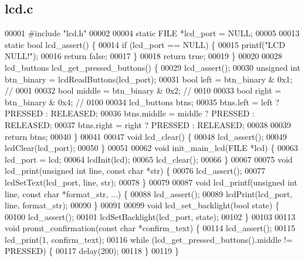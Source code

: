 \subsection{lcd.\+c}
\label{a00104_source}

\begin{DoxyCode}
00001 \textcolor{preprocessor}{#include "lcd.h"}
00002 
00004 \textcolor{keyword}{static} FILE *lcd_port = NULL;
00005 
00013 \textcolor{keyword}{static} \textcolor{keywordtype}{bool} lcd_assert() \{
00014   \textcolor{keywordflow}{if} (lcd_port == NULL) \{
00015     printf(\textcolor{stringliteral}{"LCD NULL!"});
00016     \textcolor{keywordflow}{return} \textcolor{keyword}{false};
00017   \}
00018   \textcolor{keywordflow}{return} \textcolor{keyword}{true};
00019 \}
00020 
00028 lcd_buttons lcd_get_pressed_buttons() \{
00029   lcd_assert();
00030   \textcolor{keywordtype}{unsigned} \textcolor{keywordtype}{int} btn\_binary = lcdReadButtons(lcd_port);
00031   \textcolor{keywordtype}{bool} left = btn\_binary & 0x1;   \textcolor{comment}{// 0001}
00032   \textcolor{keywordtype}{bool} middle = btn\_binary & 0x2; \textcolor{comment}{// 0010}
00033   \textcolor{keywordtype}{bool} right = btn\_binary & 0x4;  \textcolor{comment}{// 0100}
00034   lcd_buttons btns;
00035   btns.left = left ? PRESSED : RELEASED;
00036   btns.middle = middle ? PRESSED : RELEASED;
00037   btns.right = right ? PRESSED : RELEASED;
00038 
00039   \textcolor{keywordflow}{return} btns;
00040 \}
00041 
00047 \textcolor{keywordtype}{void} lcd_clear() \{
00048   lcd_assert();
00049   lcdClear(lcd_port);
00050 \}
00051 
00062 \textcolor{keywordtype}{void} init_main_lcd(FILE *lcd) \{
00063   lcd_port = lcd;
00064   lcdInit(lcd);
00065   lcd_clear();
00066 \}
00067 
00075 \textcolor{keywordtype}{void} lcd_print(\textcolor{keywordtype}{unsigned} \textcolor{keywordtype}{int} line, \textcolor{keyword}{const} \textcolor{keywordtype}{char} *str) \{
00076   lcd_assert();
00077   lcdSetText(lcd_port, line, str);
00078 \}
00079 
00087 \textcolor{keywordtype}{void} lcd_printf(\textcolor{keywordtype}{unsigned} \textcolor{keywordtype}{int} line, \textcolor{keyword}{const} \textcolor{keywordtype}{char} *format\_str, ...) \{
00088   lcd_assert();
00089   lcdPrint(lcd_port, line, format\_str);
00090 \}
00091 
00099 \textcolor{keywordtype}{void} lcd_set_backlight(\textcolor{keywordtype}{bool} state) \{
00100   lcd_assert();
00101   lcdSetBacklight(lcd_port, state);
00102 \}
00103 
00113 \textcolor{keywordtype}{void} promt_confirmation(\textcolor{keyword}{const} \textcolor{keywordtype}{char} *confirm\_text) \{
00114   lcd_assert();
00115   lcd_print(1, confirm\_text);
00116   \textcolor{keywordflow}{while} (lcd_get_pressed_buttons().middle != PRESSED) \{
00117     delay(200);
00118   \}
00119 \}
\end{DoxyCode}
